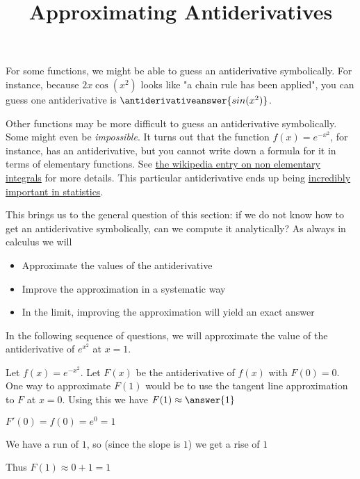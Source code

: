 \documentclass{ximera}
\title[Dig-In:]{Approximating Antiderivatives}
\begin{document}
	For some functions, we might be able to guess an antiderivative symbolically.  For instance, because $2x\cos(x^2)$ looks like "a chain rule has been applied", you can guess one antiderivative is $\antiderivativeanswer{sin(x^2)}$.
	
	Other functions may be more difficult to guess an antiderivative symbolically.  Some might even be \textit{impossible}.  It turns out that the function $f(x) = e^{-x^2}$, for instance, has an antiderivative, but you cannot write down a formula for it in terms of elementary functions.  See \href{https://en.wikipedia.org/wiki/Nonelementary_integral}{the wikipedia entry on non elementary integrals} for more details. This particular antiderivative ends up being \href{https://en.wikipedia.org/wiki/Normal_distribution}{incredibly important in statistics}.  
	
	This brings us to the general question of this section:  if we do not know how to get an antiderivative symbolically, can we compute it analytically?  As always in calculus we will
	\begin{itemize}
		\item Approximate the values of the antiderivative
		\item Improve the approximation in a systematic way
		\item In the limit, improving the approximation will yield an exact answer
	\end{itemize}	
	
	In the following sequence of questions, we will approximate the value of the antiderivative of $e^{x^2}$ at $x=1$.
	
	\begin{question}
		Let $f(x) = e^{-x^2}$.  Let $F(x)$ be the antiderivative of $f(x)$ with $F(0)=0$.  One way to approximate $F(1)$ would be to use the tangent line approximation to $F$ at $x=0$.  Using this we have $F(1) \approx \answer{1}$
		\begin{hint}
			$F'(0) = f(0) = e^0 = 1$
		\end{hint}
		\begin{hint}
			We have a run of $1$, so (since the slope is $1$) we get a rise of $1$
		\end{hint}
		\begin{hint}
			Thus $F(1) \approx 0+1 = 1$
		\end{hint}
	\end{question}
	
\end{document}
